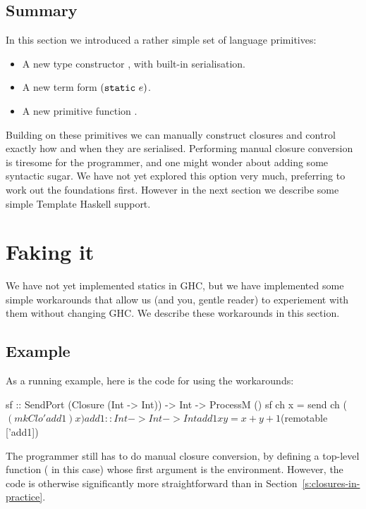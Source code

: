 \documentclass[preprint]{sigplanconf}
\begin{document}
\subsection{Summary}

In this section we introduced a rather simple set of language primitives:
\begin{itemize}
\item A new type constructor , with built-in serialisation.
\item A new term form $(\text{\tt static}~e)$.
\item A new primitive function .
\end{itemize}
Building on these primitives we can manually construct closures and
control exactly how and when they are serialised.
Performing manual closure conversion is tiresome for the programmer,
and one might wonder about adding some syntactic sugar.
We have not yet explored this option very much, preferring to work out the
foundations first.
However in the next section we describe some simple Template Haskell support.



\section{Faking it}

We have not yet implemented statics in GHC, but we have implemented
some simple workarounds that allow us (and you, gentle reader) to experiement
with them without changing GHC.  We describe these workarounds in this section.

\subsection{Example}
As a running example, here is the code for  using the workarounds:
\begin{code}
  sf :: SendPort (Closure (Int -> Int)) 
     -> Int -> ProcessM ()
  sf ch x = send ch ($(mkClo 'add1) x)

  add1 :: Int -> Int -> Int
  add1 x y = x + y + 1

  $(remotable ['add1])
\end{code}
The programmer still has to do manual closure conversion, by defining
a top-level function ( in this case) whose first argument is
the environment.  However, the code is otherwise significantly more 
straightforward than in Section~\ref{s:closures-in-practice}.
\end{document}
